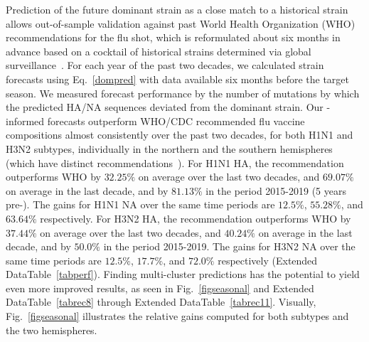 \documentclass[onecolumn, compsoc,10pt]{IEEEtran}
\def\EXTENDED{Extended Data}
\begin{document}
Prediction of the future dominant strain as  a close match to a historical strain  allows out-of-sample validation against past World Health Organization (WHO) recommendations for the flu shot, which  is  reformulated about six months in advance based on a  cocktail of historical strains determined via global surveillance~\cite{agor2018models}. For each year of the past two decades, we calculated strain forecasts using  Eq.~\eqref{dompred} with data available six months before the target season. We  measured forecast performance by the number of mutations by which the predicted HA/NA  sequences deviated from the  dominant strain. Our \enet-informed forecasts outperform  WHO/CDC recommended flu vaccine compositions almost consistently over the past two decades, for both H1N1 and H3N2 subtypes, individually in the northern and the southern hemispheres (which have distinct recommendations~\cite{boni2008vaccination}). For H1N1 HA, the \enet  recommendation outperforms  WHO  by $32.25\%$ on average over the last two decades, and $69.07\%$ on average in the last decade, and by $81.13\%$ in the period 2015-2019 (5 years pre-\cov). The gains for H1N1 NA over the same time periods are $12.5\%$, $55.28\%$, and $63.64\%$ respectively. For H3N2 HA, the \enet  recommendation outperforms  WHO  by $37.44\%$ on average over the last two decades, and $40.24\%$ on average in the last decade, and by $50.0\%$ in the period 2015-2019. The gains for H3N2 NA over the same time periods are $12.5\%$, $17.7\%$, and $72.0\%$ respectively (\EXTENDED Table~\ref{tabperf}).
Finding multi-cluster predictions has the potential to yield even more improved results, as seen in Fig.~\ref{figseasonal} and \EXTENDED Table~\ref{tabrec8} through \EXTENDED Table~\ref{tabrec11}.
Visually, Fig.~\ref{figseasonal} illustrates the relative gains computed for both subtypes and the two hemispheres.
\end{document}
